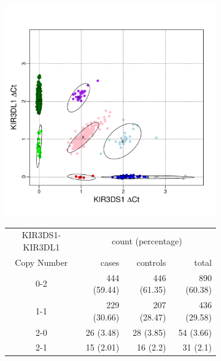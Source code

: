 

\begin{figure}[h]
    \centering
    \begin{subfigure}[c]{.5\textwidth}
        \includegraphics[scale=.5] {figures/genotyping.pdf}
    \end{subfigure}
    \begin{subfigure}[c]{.4\textwidth}\footnotesize
    \begin{tabular}{crrr}
      \toprule
      {\tiny KIR3DS1-KIR3DL1} & \multicolumn{3}{c}{count (percentage)} \\
          Copy Number & cases & controls & total \\ 
      \hline
        0-2 & 444 (59.44) & 446 (61.35) & 890 (60.38) \\ 
        1-1 & 229 (30.66) & 207 (28.47) & 436 (29.58) \\ 
        2-0 & 26 (3.48) & 28 (3.85) & 54 (3.66) \\ 
        2-1 & 15 (2.01) & 16 (2.2) & 31 (2.1) \\ 

\end{tabular}
\end{subfigure}
\end{figure}
